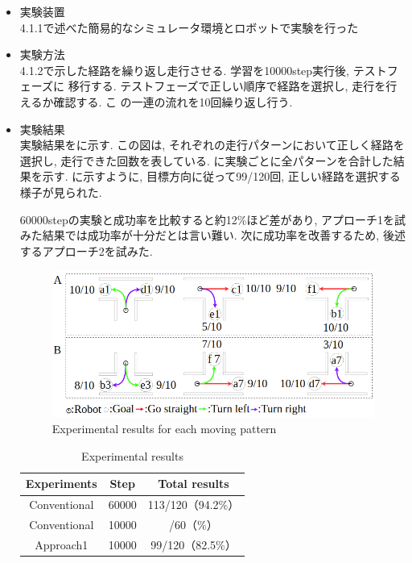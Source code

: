 \begin{itemize}
  \item 実験装置\\
  4.1.1で述べた簡易的なシミュレータ環境とロボットで実験を行った
  \item 実験方法\\
  4.1.2で示した経路を繰り返し走行させる. 学習を10000step実行後, テストフェーズに
  移行する. テストフェーズで正しい順序で経路を選択し, 走行を行えるか確認する. こ
  の一連の流れを10回繰り返し行う.
  \newpage
  \item 実験結果\\
  実験結果をに示す. この図は, それぞれの走行パターンにおいて正しく経路を選択し, 走行できた回数を表している. に実験ごとに全パターンを合計した結果を示す. 
  に示すように, 目標方向に従って99/120回, 正しい経路を選択する様子が見られた. 
  \par
  60000stepの実験と成功率を比較すると約12\%ほど差があり, アプローチ1を試みた結果では成功率が十分だとは言い難い. 次に成功率を改善するため, 後述するアプローチ2を試みた.

  \vspace{0.5cm}

  \begin{figure}[hbtp]
    \centering
   \includegraphics[keepaspectratio, scale=0.5]
        {images/10000step_act1.0.png}
   \caption{Experimental results for each moving pattern}
   \label{Fig:10000step_act1.0}
  \end{figure}  
  
  \vspace{0.5cm}

  \begin{table}[hbtp]
    \caption{Experimental results}
    \label{table:result3}
    \centering
    \begin{tabular}{|c|c|c|}
      \hline
      Experiments & Step & Total results\\
      \hline
      Conventional & 60000 & 113/120（94.2\%）\\
      \hline
      Conventional & 10000 & /60（\%）\\
      \hline
      Approach1 & 10000 & 99/120（82.5\%）\\
      \hline
    \end{tabular}
  \end{table}

\end{itemize}

